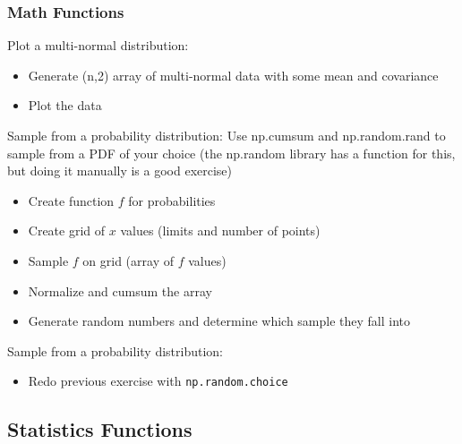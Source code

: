 \documentclass{beamer}
\newcommand{\code}[1]{\texttt{#1}}
\begin{document}
\begin{frame}	
	\frametitle{Math Functions}
	
	\begin{exampleblock}{Plot a multi-normal distribution:}
		\footnotesize
		\begin{itemize}
			\footnotesize
			\item Generate (n,2) array of multi-normal data with some mean and covariance
			\item Plot the data
		\end{itemize}
	\end{exampleblock}
	
	\begin{exampleblock}{Sample from a probability distribution:}
		\footnotesize
		Use np.cumsum and np.random.rand to sample from a PDF of your choice (the np.random library has a function for this, but doing it manually is a good exercise)
		\begin{itemize}
			\footnotesize
			\item Create function $f$ for probabilities
			\item Create grid of $x$ values (limits and number of points)
			\item Sample $f$ on grid (array of $f$ values)
			\item Normalize and cumsum the array
			\item Generate random numbers and determine which sample they fall into
		\end{itemize}
	\end{exampleblock}
	
	\begin{exampleblock}{Sample from a probability distribution:}
		\footnotesize
		\begin{itemize}
			\footnotesize
			\item Redo previous exercise with \code{np.random.choice}
		\end{itemize}
	\end{exampleblock}
	
\end{frame}


\subsection{Statistics Functions}
\end{document}
